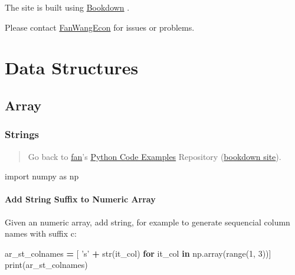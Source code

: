 \documentclass[
]{book}
\newenvironment{Shaded}{\begin{snugshade}}{\end{snugshade}}
\newcommand{\BuiltInTok}[1]{#1}
\newcommand{\ControlFlowTok}[1]{\textcolor[rgb]{0.13,0.29,0.53}{\textbf{#1}}}
\newcommand{\DecValTok}[1]{\textcolor[rgb]{0.00,0.00,0.81}{#1}}
\newcommand{\ImportTok}[1]{#1}
\newcommand{\KeywordTok}[1]{\textcolor[rgb]{0.13,0.29,0.53}{\textbf{#1}}}
\newcommand{\NormalTok}[1]{#1}
\newcommand{\OperatorTok}[1]{\textcolor[rgb]{0.81,0.36,0.00}{\textbf{#1}}}
\newcommand{\StringTok}[1]{\textcolor[rgb]{0.31,0.60,0.02}{#1}}
\begin{document}
The site is built using \href{https://bookdown.org/}{Bookdown} \citep{R-bookdown}.

Please contact \href{https://fanwangecon.github.io/}{FanWangEcon} for issues or problems.

\hypertarget{data-structures}{%
\chapter{Data Structures}\label{data-structures}}

\hypertarget{array}{%
\section{Array}\label{array}}

\hypertarget{strings}{%
\subsection{Strings}\label{strings}}

\begin{quote}
Go back to \href{http://fanwangecon.github.io/}{fan}'s \href{https://fanwangecon.github.io/pyfan/}{Python Code Examples} Repository (\href{https://fanwangecon.github.io/pyfan/bookdown}{bookdown site}).
\end{quote}

\begin{Shaded}
\begin{Highlighting}[]
\ImportTok{import}\NormalTok{ numpy }\ImportTok{as}\NormalTok{ np}
\end{Highlighting}
\end{Shaded}

\hypertarget{add-string-suffix-to-numeric-array}{%
\subsubsection{Add String Suffix to Numeric Array}\label{add-string-suffix-to-numeric-array}}

Given an numeric array, add string, for example to generate sequencial column names with suffix c:

\begin{Shaded}
\begin{Highlighting}[]
\NormalTok{ar_st_colnames }\OperatorTok{=}\NormalTok{ [ }\StringTok{'s'} \OperatorTok{+} \BuiltInTok{str}\NormalTok{(it_col) }\ControlFlowTok{for}\NormalTok{ it_col }\KeywordTok{in}\NormalTok{ np.array(}\BuiltInTok{range}\NormalTok{(}\DecValTok{1}\NormalTok{, }\DecValTok{3}\NormalTok{))]}
\BuiltInTok{print}\NormalTok{(ar_st_colnames)}
\end{Highlighting}
\end{Shaded}
\end{document}
